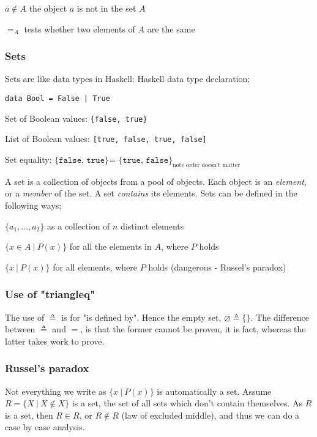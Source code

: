 \documentclass[a4paper, 12pt]{article}
\begin{document}
        $a \notin A$ \hfill the object $a$ is not in the set $A$
        \smallskip

        $=_A$ \hfill tests whether two elements of $A$ are the same
        \subsubsection*{Sets}
        Sets are like data types in Haskell: Haskell data type declaration;
        \medskip

        \texttt{data Bool = False | True}
        \smallskip

        Set of Boolean values: \hfill \texttt{\{false, true\}}
        \smallskip

        List of Boolean values: \hfill \texttt{[true, false, true, false]}
        \smallskip

        Set equality: \hfill $\texttt{\{false, true\} = \{true, false\}}_\text{note order doesn't matter}$
        \medskip

        A set is a collection of objects from a pool of objects. Each object is an \textit{element}, or a \textit{member} of the set. A set \textit{contains} its elements. Sets can be defined in the following ways;
        \medskip

        $\{a_1, ..., a_2\}$ \hfill as a collection of $n$ distinct elements
        \smallskip

        $\{x \in A\ |\ P(x)\}$ \hfill for all the elements in $A$, where $P$ holds
        \smallskip

        $\{x\ |\ P(x)\}$ \hfill for all elements, where $P$ holds (dangerous - Russel's paradox)
        \subsubsection*{Use of "triangleq"}
        The use of $\triangleq$ is for "is defined by". Hence the empty set, $\varnothing \triangleq \{\}$. The difference between $\triangleq$ and $=$, is that the former cannot be proven, it is fact, whereas the latter takes work to prove.

        \subsubsection*{Russel's paradox}
        Not everything we write as $\{x\ |\ P(x)\}$ is automatically a set. Assume $R = \{X\ |\ X \notin X\}$ is a set, the set of all sets which don't contain themselves. As $R$ is a set, then $R \in R$, or $R \notin R$ (law of excluded middle), and thus we can do a case by case analysis.
\end{document}

